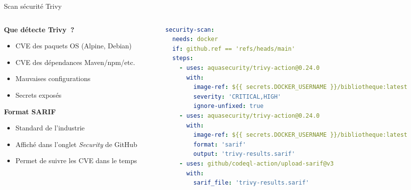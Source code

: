 \documentclass[aspectratio=169,12pt]{beamer}
\begin{document}
\begin{frame}[fragile]{Scan sécurité Trivy}
  \begin{columns}
    \begin{column}{0.5\textwidth}
      \textbf{Que détecte Trivy~?}
      \begin{itemize}
        \item CVE des paquets OS (Alpine, Debian)
        \item CVE des dépendances Maven/npm/etc.
        \item Mauvaises configurations
        \item Secrets exposés
      \end{itemize}

      \vspace{0.5em}
      \textbf{Format SARIF}
      \begin{itemize}
        \item Standard de l'industrie
        \item Affiché dans l'onglet \emph{Security} de GitHub
        \item Permet de suivre les CVE dans le temps
      \end{itemize}
    \end{column}
    \begin{column}{0.48\textwidth}
      \begin{lstlisting}[language=YAML]
security-scan:
  needs: docker
  if: github.ref == 'refs/heads/main'
  steps:
    - uses: aquasecurity/trivy-action@0.24.0
      with:
        image-ref: ${{ secrets.DOCKER_USERNAME }}/bibliotheque:latest
        severity: 'CRITICAL,HIGH'
        ignore-unfixed: true
    - uses: aquasecurity/trivy-action@0.24.0
      with:
        image-ref: ${{ secrets.DOCKER_USERNAME }}/bibliotheque:latest
        format: 'sarif'
        output: 'trivy-results.sarif'
    - uses: github/codeql-action/upload-sarif@v3
      with:
        sarif_file: 'trivy-results.sarif'
      \end{lstlisting}
    \end{column}
  \end{columns}
\end{frame}
\end{document}
